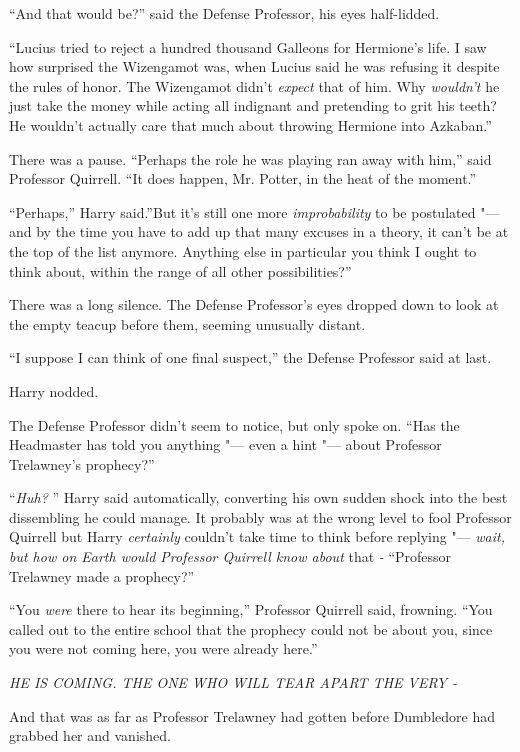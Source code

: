 ``And that would be?'' said the Defense Professor, his eyes half-lidded.

``Lucius tried to reject a hundred thousand Galleons for Hermione's life.
I saw how surprised the Wizengamot was, when Lucius said he was refusing
it despite the rules of honor. The Wizengamot didn't \emph{expect} that
of him. Why \emph{wouldn't} he just take the money while acting all
indignant and pretending to grit his teeth? He wouldn't actually care
that much about throwing Hermione into Azkaban.''

There was a pause. ``Perhaps the role he was playing ran away with
him,'' said Professor Quirrell. ``It does happen, Mr. Potter, in the
heat of the moment.''

``Perhaps,'' Harry said.''But it's still one more \emph{improbability}
to be postulated "--- and by the time you have to add up that many excuses
in a theory, it can't be at the top of the list anymore. Anything else
in particular you think I ought to think about, within the range of all
other possibilities?''

There was a long silence. The Defense Professor's eyes dropped down to
look at the empty teacup before them, seeming unusually distant.

``I suppose I can think of one final suspect,'' the Defense Professor
said at last.

Harry nodded.

The Defense Professor didn't seem to notice, but only spoke on. ``Has
the Headmaster has told you anything "--- even a hint "--- about Professor
Trelawney's prophecy?''

``\emph{Huh?} '' Harry said automatically, converting his own sudden shock
into the best dissembling he could manage. It probably was at the wrong
level to fool Professor Quirrell but Harry \emph{certainly} couldn't
take time to think before replying "--- \emph{wait, but how on Earth would
Professor Quirrell know about} that \emph{-} ``Professor Trelawney made
a prophecy?''

``You \emph{were} there to hear its beginning,'' Professor Quirrell said,
frowning. ``You called out to the entire school that the prophecy could
not be about you, since you were not coming here, you were already
here.''

\emph{HE IS COMING. THE ONE WHO WILL TEAR APART THE VERY -}

And that was as far as Professor Trelawney had gotten before Dumbledore
had grabbed her and vanished.

